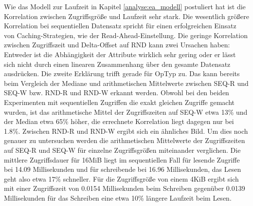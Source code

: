 \documentclass[
	12pt,
	a4paper,
	BCOR10mm,
	DIV14,
	listof=totoc,
	bibliography=totoc,
	headsepline
]{scrreprt}
\begin{document}
Wie das Modell zur Laufzeit in Kapitel \ref{analyse:ea_modell} postuliert hat ist die Korrelation zwischen Zugriffsgröße und Laufzeit sehr stark.
Die wesentlich größere Korrelation bei sequentiellen Datensatz spricht für einen erfolgreichen Einsatz von Caching-Strategien, wie der Read-Ahead-Einstellung.
Die geringe Korrelation zwischen Zugriffszeit und Delta-Offset auf RND kann zwei Ursachen haben: Entweder ist die Abhängigkeit der Attribute wirklich sehr gering oder er lässt sich nicht durch einen linearen Zusammenhang über den gesamte Datensatz ausdrücken. 
Die zweite Erklärung trifft gerade für OpTyp zu. 
Das kann bereits beim Vergleich der Mediane und arithmetischen Mittelwerte zwischen SEQ-R und SEQ-W bzw. RND-R und RND-W erkannt werden.
Obwohl bei den beiden Experimenten mit sequentiellen Zugriffen die exakt gleichen Zugriffe gemacht wurden, ist das arithmetische Mittel der Zugriffszeiten auf SEQ-W etwa 13\% und der Median etwa 65\% höher, die errechnete Korrelation liegt dagegen nur bei 1.8\%. Zwischen RND-R und RND-W ergibt sich ein ähnliches Bild.
Um dies noch genauer zu untersuchen werden die arithmetischen Mittelwerte der Zugriffszeiten auf SEQ-R und SEQ-W für einzelne Zugriffsgrößen miteinander verglichen.
Die mittlere Zugriffsdauer für 16MiB liegt im sequentiellen Fall für lesende Zugriffe bei 14.09 Millisekunden und für schreibende bei 16.96 Millisekunden, das Lesen geht also etwa 17\% schneller.
Für die Zugriffsgröße von einem 4KiB ergibt sich mit einer Zugriffszeit von 0.0154 Millisekunden beim Schreiben gegenüber 0.0139 Millisekunden für das Schreiben eine etwa 10\% längere Laufzeit beim Lesen.

\begin{table}
	\scriptsize
\end{table}
\end{document}
